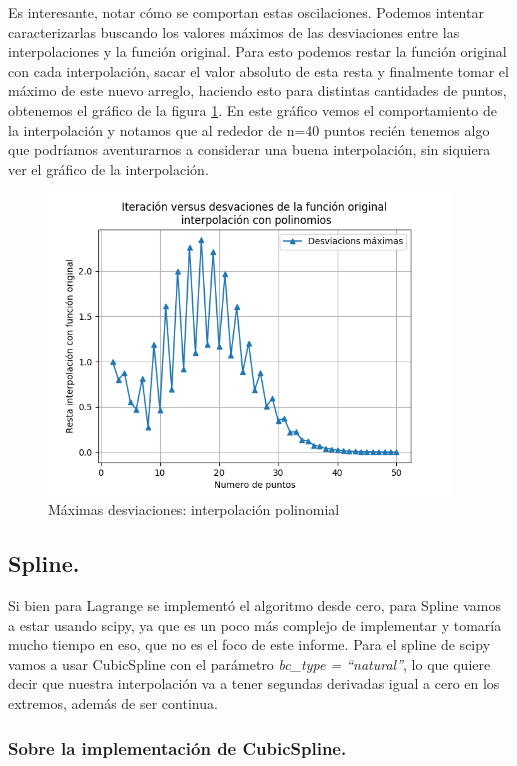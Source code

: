 \documentclass[letter, 11pt]{article}
\begin{document}
Es interesante, notar cómo se comportan estas oscilaciones.
Podemos intentar caracterizarlas buscando los valores máximos de
las desviaciones entre las interpolaciones y la función
original. Para esto podemos restar la función original con cada
interpolación, sacar el valor absoluto de esta resta y
finalmente tomar el máximo de este nuevo arreglo, haciendo esto
para distintas cantidades de puntos, obtenemos el gráfico de la
figura \ref{P1_3}. En este gráfico vemos el comportamiento de la
interpolación y notamos que al rededor de n=40 puntos recién
tenemos algo que podríamos aventurarnos a considerar una buena
interpolación, sin siquiera ver el gráfico de la interpolación.


\begin{figure}[H]
  \centering
  \includegraphics[height=8cm]{P1_3.png}
  \caption{Máximas desviaciones: interpolación polinomial}
  \label{P1_3}
\end{figure}




\subsection{Spline.}

Si bien para Lagrange se implementó el algoritmo desde cero,
para Spline vamos a estar usando scipy, ya que es un poco
más complejo de implementar y tomaría mucho tiempo en eso,
que no es el foco de este informe. Para el spline de scipy vamos
a usar CubicSpline con el parámetro \emph{bc\_type = ``natural''}, lo que quiere decir que nuestra interpolación va a
tener segundas derivadas igual a cero en los extremos, además de
ser continua.

\subsubsection{Sobre la implementación de CubicSpline.}
\end{document}
